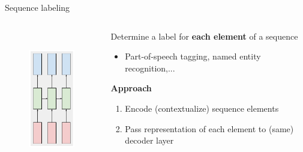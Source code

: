 \documentclass[12pt,aspectratio=169,handout]{beamer}
\begin{document}
\begin{frame}{Sequence labeling}
	\begin{columns}[T] %
		\begin{column}{.3\textwidth}
			
			\begin{figure}[h]
				\includegraphics[height=6cm]{sequence_labeling.pdf}
			\end{figure}
			
		\end{column}
		\begin{column}{.7\textwidth}
			\vspace{1cm}
			Determine a label for \textbf{each element} of a sequence
			\begin{itemize}
				\item Part-of-speech tagging, named entity recognition,...
			\end{itemize}
			\pause
			\textbf{Approach}
			\begin{enumerate}
				\item Encode (contextualize) sequence elements
				\item Pass representation of each element to (same) decoder layer
			\end{enumerate}
		\end{column}
	\end{columns}
	
\end{frame}
\end{document}
